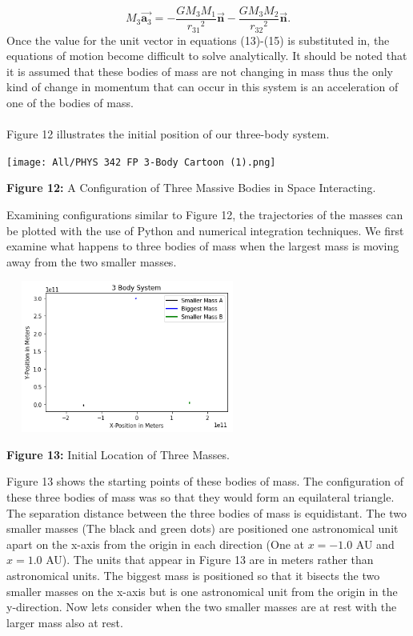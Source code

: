 \documentclass[]{article}
\begin{document}
\begin{multicols}{2}
\begin{equation}
\end{equation}
\begin{equation}\label{15}
M_3 \Vec{\textbf{a}_3}=-\frac{GM_3M_1}{{r_{31}}^2}{\Vec{\textbf{n}}}-\frac{GM_3M_2}{{r_{32}}^2}{\Vec{\textbf{n}}}.    
\end{equation}
Once the value for the unit vector in equations (13)-(15) is substituted in, the equations of motion become difficult to solve analytically. It should be noted that it is assumed that these bodies of mass are not changing in mass thus the only kind of change in momentum that can occur in this system is an acceleration of one of the bodies of mass.
\par
\paragraph{}
\setlength{\parskip}{1em}
Figure 12 illustrates the initial position of our three-body system.
\begin{center}
\texttt{[image: All/PHYS 342 FP 3-Body Cartoon (1).png]}
\caption{\small{\textbf{Figure 12:}} \tiny{A Configuration of Three Massive Bodies in Space Interacting.}}
\end{center}
Examining configurations similar to Figure 12, the trajectories of the masses can be plotted with the use of Python and numerical integration techniques. We first examine what happens to three bodies of mass when the largest mass is moving away from the two smaller masses. 
\begin{center}
\includegraphics[width=8cm, height=5cm]{PHYS 342 FP 3-Body Dynamics (1).png}
\caption{\small{\textbf{Figure 13:}} \tiny{Initial Location of Three Masses.}}
\end{center}
Figure 13 shows the starting points of these bodies of mass. The configuration of these three bodies of mass was so that they would form an equilateral triangle. The separation distance between the three bodies of mass is equidistant. The two smaller masses (The black and green dots) are positioned one astronomical unit apart on the x-axis from the origin in each direction (One at $x=-1.0$ AU and $x=1.0$ AU). The units that appear in Figure 13 are in meters rather than astronomical units. The biggest mass is positioned so that it bisects the two smaller masses on the x-axis but is one astronomical unit from the origin in the y-direction. Now lets consider when the two smaller masses are at rest with the larger mass also at rest.

\end{multicols}
\end{document}
